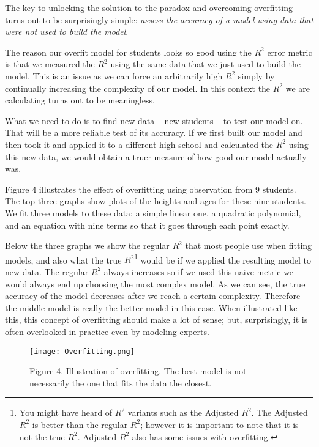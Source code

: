 \documentclass[]{memoir}
\makeatletter
\def\maxwidth{\ifdim\Gin@nat@width>\linewidth\linewidth
\else\Gin@nat@width\fi}
\let\Oldincludegraphics\includegraphics
\renewcommand{\includegraphics}[1]{\Oldincludegraphics[width=\maxwidth]{#1}}
\makeatother
\begin{document}
The key to unlocking the solution to the paradox and overcoming
overfitting turns out to be surprisingly simple: \emph{assess the
accuracy of a model using data that were not used to build the model}.

The reason our overfit model for students looks so good using the $R^2$
error metric is that we measured the $R^2$ using the same data that we
just used to build the model. This is an issue as we can force an
arbitrarily high $R^2$ simply by continually increasing the complexity
of our model. In this context the $R^2$ we are calculating turns out to
be meaningless.

What we need to do is to find new data -- new students -- to test our
model on. That will be a more reliable test of its accuracy. If we first
built our model and then took it and applied it to a different high
school and calculated the $R^2$ using this new data, we would obtain a
truer measure of how good our model actually was.

Figure 4 illustrates the effect of overfitting using observation from 9
students. The top three graphs show plots of the heights and ages for
these nine students. We fit three models to these data: a simple linear
one, a quadratic polynomial, and an equation with nine terms so that it
goes through each point exactly.

Below the three graphs we show the regular $R^2$ that most people use
when fitting models, and also what the true $R^2$\footnote{You might
  have heard of $R^2$ variants such as the Adjusted $R^2$. The Adjusted
  $R^2$ is better than the regular $R^2$; however it is important to
  note that it is not the true $R^2$. Adjusted $R^2$ also has some
  issues with overfitting.} would be if we applied the resulting model
to new data. The regular $R^2$ always increases so if we used this naive
metric we would always end up choosing the most complex model. As we can
see, the true accuracy of the model decreases after we reach a certain
complexity. Therefore the middle model is really the better model in
this case. When illustrated like this, this concept of overfitting
should make a lot of sense; but, surprisingly, it is often overlooked in
practice even by modeling experts.

\begin{figure}[htbp]
\centering
\texttt{[image: Overfitting.png]}
\caption{Figure 4. Illustration of overfitting. The best model is not
necessarily the one that fits the data the closest.}
\end{figure}
\end{document}
